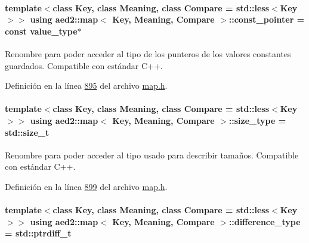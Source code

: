\paragraph[{\texorpdfstring{const\+\_\+pointer}{const_pointer}}]{\setlength{\rightskip}{0pt plus 5cm}template$<$class Key, class Meaning, class Compare = std\+::less$<$\+Key$>$$>$ using {\bf aed2\+::map}$<$ Key, Meaning, Compare $>$\+::{\bf const\+\_\+pointer} =  const {\bf value\+\_\+type}$\ast$}\hypertarget{classaed2_1_1map_a1366fc3e227a49777cb748fc6d4e022b_a1366fc3e227a49777cb748fc6d4e022b}{}\label{classaed2_1_1map_a1366fc3e227a49777cb748fc6d4e022b_a1366fc3e227a49777cb748fc6d4e022b}


Renombre para poder acceder al tipo de los punteros de los valores constantes guardados. Compatible con estándar C++. 



Definición en la línea \hyperlink{map_8h_source_l00895}{895} del archivo \hyperlink{map_8h_source}{map.\+h}.

\paragraph[{\texorpdfstring{size\+\_\+type}{size_type}}]{\setlength{\rightskip}{0pt plus 5cm}template$<$class Key, class Meaning, class Compare = std\+::less$<$\+Key$>$$>$ using {\bf aed2\+::map}$<$ Key, Meaning, Compare $>$\+::{\bf size\+\_\+type} =  std\+::size\+\_\+t}\hypertarget{classaed2_1_1map_a8cf1c570f605e9c0ad6feb8ce12c9400_a8cf1c570f605e9c0ad6feb8ce12c9400}{}\label{classaed2_1_1map_a8cf1c570f605e9c0ad6feb8ce12c9400_a8cf1c570f605e9c0ad6feb8ce12c9400}


Renombre para poder acceder al tipo usado para describir tamaños. Compatible con estándar C++. 



Definición en la línea \hyperlink{map_8h_source_l00899}{899} del archivo \hyperlink{map_8h_source}{map.\+h}.

\paragraph[{\texorpdfstring{difference\+\_\+type}{difference_type}}]{\setlength{\rightskip}{0pt plus 5cm}template$<$class Key, class Meaning, class Compare = std\+::less$<$\+Key$>$$>$ using {\bf aed2\+::map}$<$ Key, Meaning, Compare $>$\+::{\bf difference\+\_\+type} =  std\+::ptrdiff\+\_\+t}\hypertarget{classaed2_1_1map_a2f55b88809000fcbfce1c6cfef1ba74d_a2f55b88809000fcbfce1c6cfef1ba74d}{}\label{classaed2_1_1map_a2f55b88809000fcbfce1c6cfef1ba74d_a2f55b88809000fcbfce1c6cfef1ba74d}


